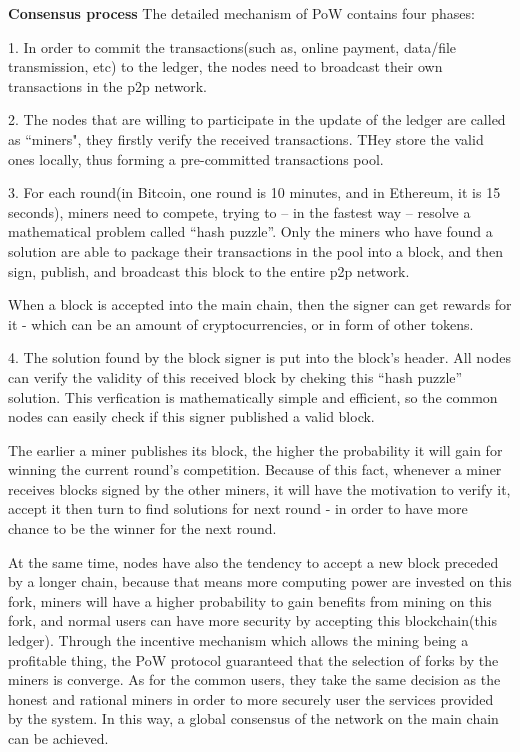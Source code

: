 \documentclass[doublespacing]{bmcart}
\begin{document}
\begin{CJK*}{UTF8}{gbsn}
    \textbf{Consensus process}
    The detailed mechanism of PoW contains four phases:
	    
    1. In order to commit the transactions(such as, online payment, data/file transmission, etc) to the ledger, the nodes need to broadcast their own transactions in the p2p network.
    
    2. The nodes that are willing to participate in the update of the ledger are called as ``miners", they firstly verify the received transactions. THey store the valid ones locally, thus forming a pre-committed transactions pool.
    
    3. For each round(in Bitcoin, one round is 10 minutes, and in Ethereum, it is 15 seconds), miners need to compete, trying to – in the fastest way – resolve a mathematical problem called “hash puzzle”. Only the miners who have found a solution are able to package their transactions in the pool into a block, and then sign, publish, and broadcast this block to the entire p2p network.
     
     When a block is accepted into the main chain, then the signer can get rewards for it - which can be an amount of cryptocurrencies, or in form of other tokens.
        
     4. The solution found by the block signer is put into the block's header. All nodes can verify the validity of this received block by cheking this ``hash puzzle'' solution. This verfication is mathematically simple and efficient, so the common nodes can easily check if this signer published a valid block.
    
       The earlier a miner publishes its block, the higher the probability it will gain for winning the current round’s competition. Because of this fact, whenever a miner receives blocks signed by the other miners, it will have the motivation to verify it, accept it then turn to find solutions for next round - in order to have more chance to be the winner for the next round.

     At the same time, nodes have also the tendency to accept a new block preceded by a longer chain, because that means more computing power are invested on this fork, miners will have a higher probability to gain benefits from mining on this fork, and normal users can have more security by accepting this blockchain(this ledger). Through the incentive mechanism which allows the mining being a profitable thing, the PoW protocol guaranteed that the selection of forks by the miners is converge. As for the common users, they take the same decision as the honest and rational miners in order to more securely user the services provided by the system. In this way, a global consensus of the network on the main chain can be achieved.


\end{CJK*}
\end{document}
